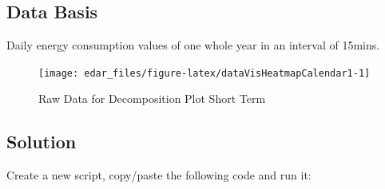 \documentclass[
  a4paperpaper,
]{book}
\begin{document}
\hypertarget{data-basis-6}{%
\subsection{Data Basis}\label{data-basis-6}}

Daily energy consumption values of one whole year in an interval of 15mins.

\begin{figure}
\texttt{[image: edar\_files/figure-latex/dataVisHeatmapCalendar1-1]} \caption{Raw Data for Decomposition Plot Short Term}\label{fig:dataVisHeatmapCalendar1}
\end{figure}

\newpage

\hypertarget{solution-6}{%
\subsection{Solution}\label{solution-6}}

Create a new script, copy/paste the following code and run it:
\end{document}
